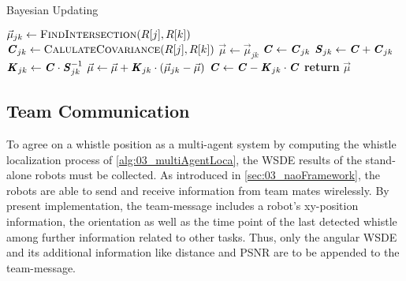 \begin{algorithm}[H]
    \caption{Bayesian Updating}\label{alg:03_multiAgentLoca}
    \begin{algorithmic}[1]
                    \State $\vec{\mu}_{jk} \gets \Call{FindIntersection}{R[j], R[k]}$
                    \State $\textbf{\textit{C}}_{jk} \gets \Call{CalulateCovariance}{R[j], R[k]}$
                        \State $\vec{\mu} \gets \vec{\mu}_{jk}$
                        \State $\textbf{\textit{C}} \gets \textbf{\textit{C}}_{jk}$
                        \State $\textbf{\textit{S}}_{jk} \gets \textbf{\textit{C}} + \textbf{\textit{C}}_{jk}$
                        \State $\textbf{\textit{K}}_{jk} \gets \textbf{\textit{C}} \cdot \textbf{\textit{S}}_{jk}^{-1}$
                        \State $\vec{\mu} \gets \vec{\mu} + \textbf{\textit{K}}_{jk} \cdot (\vec{\mu}_{jk} - \vec{\mu})$
                        \State $\textbf{\textit{C}} \gets \textbf{\textit{C}} - \textbf{\textit{K}}_{jk} \cdot \textbf{\textit{C}}$
                    \EndIf
                \EndFor
            \EndFor
            \State \textbf{return} $\vec{\mu}$
        \EndProcedure\vspace{12pt}
    \end{algorithmic}
\end{algorithm}

\subsection{Team Communication}
\label{subsec:03_teamCommunication}

To agree on a whistle position as a multi-agent system by computing the whistle
localization process of \cref{alg:03_multiAgentLoca}, the \ac{WSDE} results of the
stand-alone robots must be collected.
As introduced in \cref{sec:03_naoFramework}, the robots are able to send and receive
information from team mates wirelessly.
By present implementation, the team-message includes a robot's xy-position information,
the orientation as well as the time point of the last detected whistle among further information
related to other tasks.
Thus, only the angular \ac{WSDE} and its additional information like distance and \ac{PSNR}
are to be appended to the team-message.

